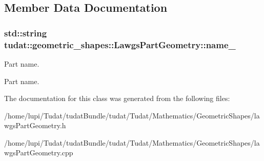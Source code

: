 \subsection{Member Data Documentation}
\subsubsection[{\texorpdfstring{name\+\_\+}{name_}}]{\setlength{\rightskip}{0pt plus 5cm}std\+::string tudat\+::geometric\+\_\+shapes\+::\+Lawgs\+Part\+Geometry\+::name\+\_\+\hspace{0.3cm}{\ttfamily [protected]}}\hypertarget{classtudat_1_1geometric__shapes_1_1LawgsPartGeometry_a45a1463a81f989e428f955686ab986c9}{}\label{classtudat_1_1geometric__shapes_1_1LawgsPartGeometry_a45a1463a81f989e428f955686ab986c9}


Part name. 

Part name. 

The documentation for this class was generated from the following files\+:\begin{DoxyCompactItemize}
\item 
/home/lupi/\+Tudat/tudat\+Bundle/tudat/\+Tudat/\+Mathematics/\+Geometric\+Shapes/lawgs\+Part\+Geometry.\+h\item 
/home/lupi/\+Tudat/tudat\+Bundle/tudat/\+Tudat/\+Mathematics/\+Geometric\+Shapes/lawgs\+Part\+Geometry.\+cpp\end{DoxyCompactItemize}
